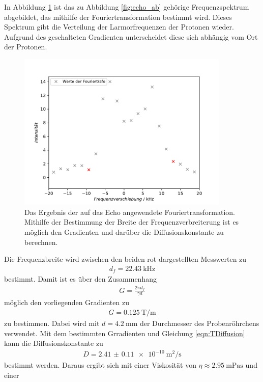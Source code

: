 In Abbildung \ref{fig:ft} ist das zu Abbildung \ref{fig:echo_ab} gehörige Frequenzspektrum abgebildet, das mithilfe der
Fouriertransformation bestimmt wird. Dieses Spektrum gibt die Verteilung der Larmorfrequenzen der Protonen wieder.
Aufgrund des geschalteten Gradienten unterscheidet diese sich abhängig vom Ort der Protonen.
\begin{figure}[H]
  \centering
  \includegraphics[width=0.9\textwidth]{../Auswertung/echo_ft.pdf}
  \caption{Das Ergebnis der auf das Echo angewendete Fouriertransformation. Mithilfe der Bestimmung der Breite der Frequenzverbreiterung
  ist es möglich den Gradienten und darüber die Diffusionskonstante zu berechnen.}
  \label{fig:ft}
\end{figure} \noindent
Die Frequenzbreite wird zwischen den beiden rot dargestellten Messwerten zu
\begin{align*}
  d_f = \SI{22.43}{\kilo\hertz}
\end{align*}
bestimmt.
Damit ist es über den Zusammenhang
\begin{align*}
  G = \frac{2\pi d_f}{\gamma d}
\end{align*}
möglich den vorliegenden Gradienten zu
\begin{align}
  G = \SI{0.125}{\tesla\per\meter}
\end{align}
zu bestimmen. Dabei wird mit $d = \SI{4.2}{\milli\meter}$ der Durchmesser des Probenröhrchens verwendet.
Mit dem bestimmten Grradienten und Gleichung \eqref{eqn:TDiffusion} kann die Diffusionskonstante zu
\begin{align}
  D = \SI{2.41(011)e-10}{\square\meter\per\second}
\end{align}
bestimmt werden.
Daraus ergibt sich mit einer Viskosität von $\eta \approx \SI{2.95}{\milli\pascal\second}$ \cite{viso} und einer
